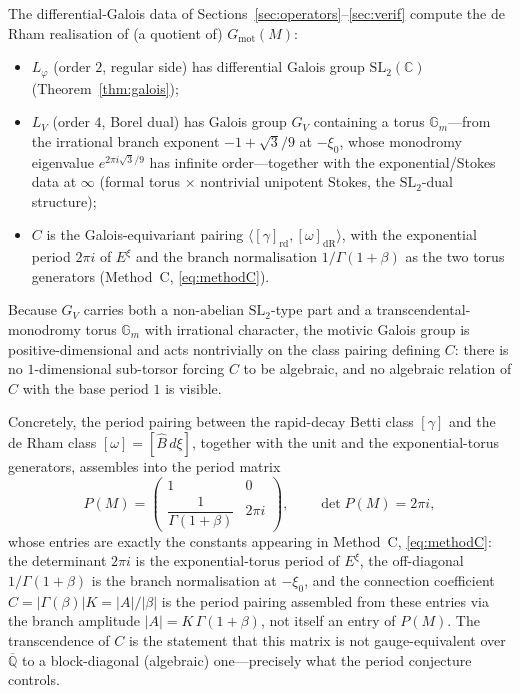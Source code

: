 \documentclass[11pt,reqno]{amsart}
\theoremstyle{plain}
\theoremstyle{definition}
\newcommand{\Bhat}{\widehat{B}}
\newcommand{\Lphi}{L_{\varphi}}
\newcommand{\LV}{L_{V}}
\newcommand{\Qbar}{\overline{\mathbb{Q}}}
\newcommand{\xizero}{\xi_0}
\newcommand{\SL}{\mathrm{SL}}
\newcommand{\Gm}{\mathbb{G}_m}
\providecommand{\C}{}\renewcommand{\C}{C}
\begin{document}
The differential-Galois data of Sections~\ref{sec:operators}--\ref{sec:verif} compute the de Rham
realisation of (a quotient of) $G_{\mathrm{mot}}(M)$:
\begin{itemize}[leftmargin=1.4em,itemsep=2pt]
  \item $\Lphi$ (order $2$, regular side) has differential Galois group $\SL_2(\mathbb{C})$
        (Theorem~\ref{thm:galois});
  \item $\LV$ (order $4$, Borel dual) has Galois group $G_V$ containing a torus $\Gm$---from the
        irrational branch exponent $-1+\sqrt3/9$ at $-\xizero$, whose monodromy eigenvalue
        $e^{2\pi i\sqrt3/9}$ has infinite order---together with the exponential/Stokes data at
        $\infty$ (formal torus $\times$ nontrivial unipotent Stokes, the $\SL_2$-dual structure);
  \item $\C$ is the Galois-equivariant pairing $\langle[\gamma]_{\mathrm{rd}},[\omega]_{\mathrm{dR}}\rangle$,
        with the exponential period $2\pi i$ of $E^{\xi}$ and the branch normalisation
        $1/\Gamma(1+\beta)$ as the two torus generators (Method~C, \eqref{eq:methodC}).
\end{itemize}
Because $G_V$ carries both a non-abelian $\SL_2$-type part and a transcendental-monodromy torus
$\Gm$ with irrational character, the motivic Galois group is positive-dimensional and acts
nontrivially on the class pairing defining $\C$: there is no $1$-dimensional sub-torsor forcing $\C$
to be algebraic, and no algebraic relation of $\C$ with the base period $1$ is visible.

Concretely, the period pairing between the rapid-decay Betti class $[\gamma]$ and the de Rham class
$[\omega]=[\Bhat\,d\xi]$, together with the unit and the exponential-torus generators, assembles
into the period matrix
\begin{equation}\label{eq:periodmatrix}
  P(M)=\begin{pmatrix} 1 & 0\\[2pt] \dfrac{1}{\Gamma(1+\beta)} & 2\pi i\end{pmatrix},
  \qquad \det P(M)=2\pi i,
\end{equation}
whose entries are exactly the constants appearing in Method~C, \eqref{eq:methodC}: the determinant
$2\pi i$ is the exponential-torus period of $E^{\xi}$, the off-diagonal $1/\Gamma(1+\beta)$ is the
branch normalisation at $-\xizero$, and the connection coefficient
$\C=\lvert\Gamma(\beta)\rvert K=\lvert A\rvert/\lvert\beta\rvert$ is the period pairing assembled
from these entries via the branch amplitude $\lvert A\rvert=K\,\Gamma(1+\beta)$, not itself an
entry of $P(M)$. The transcendence
of $\C$ is the statement that this matrix is not gauge-equivalent over $\Qbar$ to a block-diagonal
(algebraic) one---precisely what the period conjecture controls.
\end{document}
